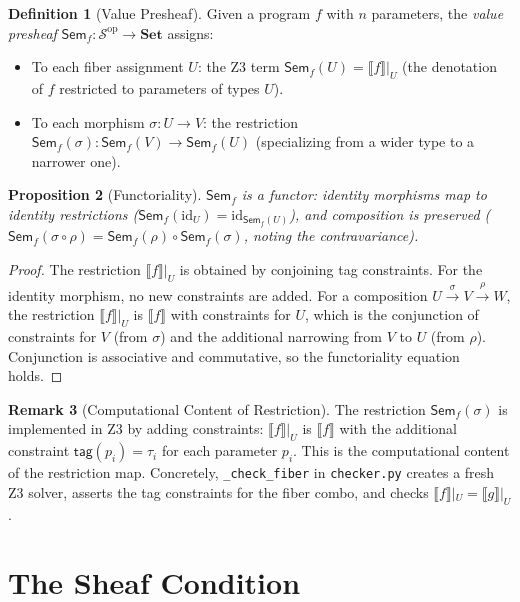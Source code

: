 \documentclass[11pt,a4paper]{report}
\theoremstyle{definition}
\newtheorem{definition}{Definition}[chapter]
\newtheorem{remark}[definition]{Remark}
\theoremstyle{plain}
\newtheorem{proposition}[definition]{Proposition}
\newcommand{\den}[1]{\llbracket #1 \rrbracket}
\newcommand{\Set}{\mathbf{Set}}
\newcommand{\Sem}{\mathsf{Sem}}
\newcommand{\site}{\mathcal{S}}
\begin{document}
\begin{definition}[Value Presheaf]
\label{def:value-presheaf}
Given a program $f$ with $n$ parameters, the \emph{value presheaf}
$\Sem_f : \site^{\mathrm{op}} \to \Set$ assigns:
\begin{itemize}
  \item To each fiber assignment $U$: the Z3 term
    $\Sem_f(U) = \den{f}|_U$ (the denotation of $f$ restricted to
    parameters of types $U$).
  \item To each morphism $\sigma : U \to V$: the restriction
    $\Sem_f(\sigma) : \Sem_f(V) \to \Sem_f(U)$ (specializing from
    a wider type to a narrower one).
\end{itemize}
\end{definition}

\begin{proposition}[Functoriality]
$\Sem_f$ is a functor: identity morphisms map to identity restrictions
($\Sem_f(\mathrm{id}_U) = \mathrm{id}_{\Sem_f(U)}$), and composition
is preserved ($\Sem_f(\sigma \circ \rho) = \Sem_f(\rho) \circ
\Sem_f(\sigma)$, noting the contravariance).
\end{proposition}

\begin{proof}
The restriction $\den{f}|_U$ is obtained by conjoining tag constraints.
For the identity morphism, no new constraints are added.  For a
composition $U \xrightarrow{\sigma} V \xrightarrow{\rho} W$, the
restriction $\den{f}|_U$ is $\den{f}$ with constraints for $U$,
which is the conjunction of constraints for $V$ (from $\sigma$) and the
additional narrowing from $V$ to $U$ (from $\rho$).  Conjunction is
associative and commutative, so the functoriality equation holds.
\end{proof}

\begin{remark}[Computational Content of Restriction]
The restriction $\Sem_f(\sigma)$ is implemented in Z3 by adding
constraints: $\den{f}|_U$ is $\den{f}$ with the additional constraint
$\mathsf{tag}(p_i) = \tau_i$ for each parameter $p_i$.  This is
the computational content of the restriction map.  Concretely,
\texttt{\_check\_fiber} in \texttt{checker.py} creates a fresh Z3
solver, asserts the tag constraints for the fiber combo, and checks
$\den{f}|_U = \den{g}|_U$.
\end{remark}

\section{The Sheaf Condition}
\end{document}

